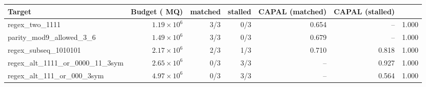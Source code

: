 \begin{tabular}{lrrrrrr}
\toprule
Target & Budget (\ours{} MQ) & matched & stalled & CAPAL (matched) & CAPAL (stalled) & \ours{} \\
\midrule
regex\_two\_1111 & $1.19 \times 10^{6}$ & 3/3 & 0/3 & 0.654 & -- & 1.000 \\
parity\_mod9\_allowed\_3\_6 & $1.49 \times 10^{6}$ & 3/3 & 0/3 & 0.679 & -- & 1.000 \\
regex\_subseq\_1010101 & $2.17 \times 10^{6}$ & 2/3 & 1/3 & 0.710 & 0.818 & 1.000 \\
regex\_alt\_1111\_or\_0000\_11\_3sym & $2.65 \times 10^{6}$ & 0/3 & 3/3 & -- & 0.927 & 1.000 \\
regex\_alt\_111\_or\_000\_3sym & $4.97 \times 10^{6}$ & 0/3 & 3/3 & -- & 0.564 & 1.000 \\
\bottomrule
\end{tabular}
